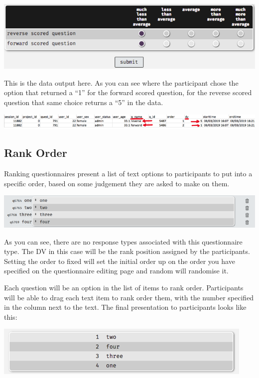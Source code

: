\documentclass[]{book}
\begin{document}
\includegraphics{images/screenshots/radio_4.png}

This is the data output here. As you can see where the participant chose
the option that returned a ``1'' for the forward scored question, for
the reverse scored question that same choice returns a ``5'' in the
data.

\includegraphics{images/screenshots/radio_5.png}

\subsection{Rank Order}\label{rank-order}

Ranking questionnaires present a list of text options to participants to
put into a specific order, based on some judgement they are asked to
make on them.

\includegraphics{images/screenshots/rank1.png}

As you can see, there are no response types associated with this
questionnaire type. The DV in this case will be the rank position
assigned by the participants. Setting the order to fixed will set the
initial order up on the order you have specified on the questionnaire
editing page and random will randomise it.

Each question will be an option in the list of items to rank order.
Participants will be able to drag each text item to rank order them,
with the number specified in the column next to the text. The final
presentation to participants looks like this:

\includegraphics{images/screenshots/rank2a.png}
\end{document}
